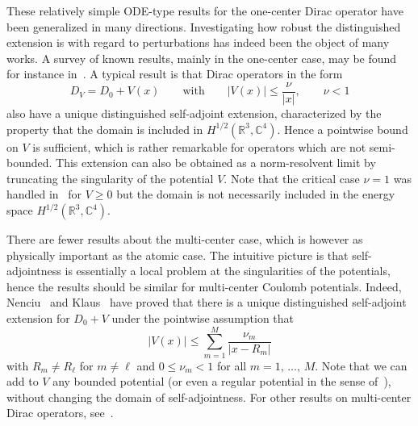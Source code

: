 \documentclass[AHL,Unicode,published]{cedram}
\newcommand{\R}{\mathbb{R}}
\newcommand{\C}{\mathbb{C}}
\newcommand\1{{\ensuremath {\mathds 1} }}
\renewcommand{\geq}{\geqslant}
\renewcommand{\leq}{\leqslant}
\begin{document}
These relatively simple ODE-type results for the one-center Dirac operator have been generalized in many directions. Investigating how robust the distinguished extension is with regard to perturbations has indeed been the object of many works. A survey of known results, mainly in the one-center case, may be found for instance in~\cite[Section~1.3]{EstLewSer-19}. A typical result is that Dirac operators in the form
\begin{equation}\label{eq:pointwise_one-center}
D_V=D_0+V(x)\qquad\text{with}\qquad |V(x)|\leq \frac{\nu}{|x|},\qquad \nu<1
\end{equation}
also have a unique distinguished self-adjoint extension, characterized by the property that the domain is included in $H^{1/2}(\R^3,\C^4)$. Hence a pointwise bound on $V$ is sufficient, which is rather remarkable for operators which are not semi-bounded. This extension can also be obtained as a norm-resolvent limit by truncating the singularity of the potential $V$. Note that the critical case $\nu=1$ was handled in~\cite{EstLos-07} for $V\geq0$ but the domain is not necessarily included in the energy space $H^{1/2}(\R^3,\C^4)$.

There are fewer results about the multi-center case, which is however as physically important as the atomic case. The intuitive picture is that self-adjointness is essentially a local problem at the singularities of the potentials, hence the results should be similar for multi-center Coulomb potentials. Indeed, Nenciu~\cite{Nenciu-77} and Klaus~\cite{Klaus-80b} have proved that there is a unique distinguished self-adjoint extension for $D_0+V$ under the pointwise assumption that
\begin{equation}\label{eq:ass_V_subcritical}
\left|V(x)\right|\leq \sum_{m=1}^M\frac{\nu_m}{\left|x-R_m\right|}
\end{equation}
with $R_m\neq R_\ell$ for $m\neq \ell$ and $0\leq \nu_m<1$ for all $m=1,\,\dots,\,M$. Note that we can add to $V$ any bounded potential (or even a regular potential in the sense of~\cite{Nenciu-76,Nenciu-77}), without changing the domain of self-adjointness. For other results on multi-center Dirac operators, see~\cite{BriHog-03,Kanarski-85}.
\end{document}
